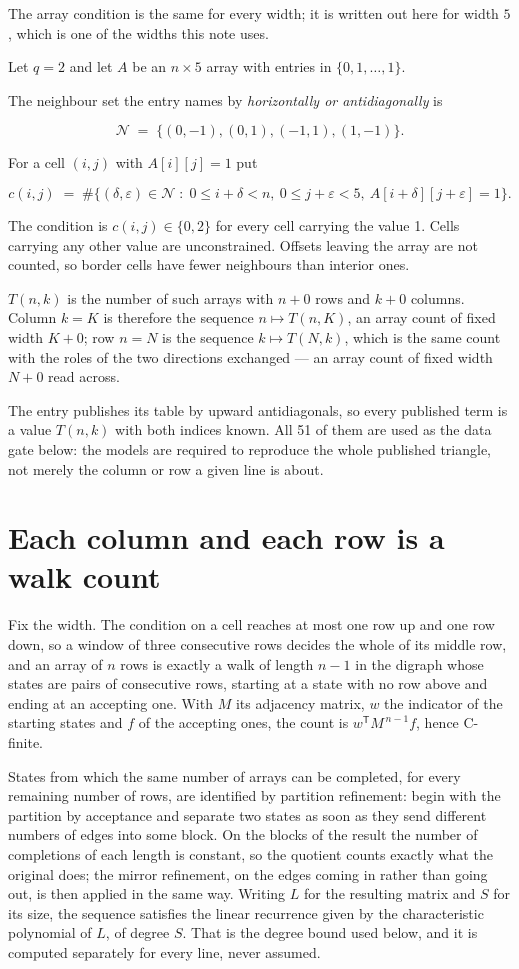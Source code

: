 \documentclass[11pt]{article}
\theoremstyle{definition}
\begin{document}
The array condition is the same for every width; it is written out here for width $5$, which is one of the widths this note uses.

Let $q = 2$ and let $A$ be an $n \times 5$ array with entries in $\{0,1,\dots,1\}$.

The neighbour set the entry names by {\itshape horizontally or antidiagonally} is

\[\mathcal{N} \;=\; \{(0,-1), (0,1), (-1,1), (1,-1)\}.\]

For a cell $(i,j)$ with $A[i][j] = 1$ put

\[c(i,j) \;=\; \#\bigl\{(\delta,\varepsilon)\in\mathcal{N} \;:\; 0\le i+\delta<n,\ 0\le j+\varepsilon<5,\ A[i+\delta][j+\varepsilon] = 1\bigr\}.\]

The condition is $c(i,j) \in \{0, 2\}$ for every cell carrying the value 1. Cells carrying any other value are unconstrained. Offsets leaving the array are not counted, so border cells have fewer neighbours than interior ones.

$T(n,k)$ is the number of such arrays with $n + 0$ rows and $k + 0$ columns. Column $k = K$ is therefore the sequence $n \mapsto T(n,K)$, an array count of fixed width $K + 0$; row $n = N$ is the sequence $k \mapsto T(N,k)$, which is the same count with the roles of the two directions exchanged --- an array count of fixed width $N + 0$ read across.

The entry publishes its table by upward antidiagonals, so every published term is a value $T(n,k)$ with both indices known. All 51 of them are used as the data gate below: the models are required to reproduce the whole published triangle, not merely the column or row a given line is about.

\section{Each column and each row is a walk count}

Fix the width. The condition on a cell reaches at most one row up and one row down, so a window of three consecutive rows decides the whole of its middle row, and an array of $n$ rows is exactly a walk of length $n-1$ in the digraph whose states are pairs of consecutive rows, starting at a state with no row above and ending at an accepting one. With $M$ its adjacency matrix, $w$ the indicator of the starting states and $f$ of the accepting ones, the count is $w^{\mathsf T}M^{\,n-1}f$, hence C-finite.

States from which the same number of arrays can be completed, for every remaining number of rows, are identified by partition refinement: begin with the partition by acceptance and separate two states as soon as they send different numbers of edges into some block. On the blocks of the result the number of completions of each length is constant, so the quotient counts exactly what the original does; the mirror refinement, on the edges coming in rather than going out, is then applied in the same way. Writing $L$ for the resulting matrix and $S$ for its size, the sequence satisfies the linear recurrence given by the characteristic polynomial of $L$, of degree $S$. That is the degree bound used below, and it is computed separately for every line, never assumed.
\end{document}
